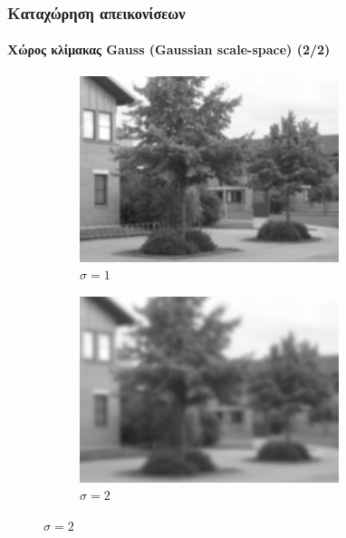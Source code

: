 \documentclass{beamer}
\begin{document}
\begin{frame}
\frametitle{Καταχώρηση απεικονίσεων}
\framesubtitle{Χώρος κλίμακας Gauss (Gaussian scale-space) (2/2)}

\begin{figure}[H]
    \centering

    \begin{subfigure}[b]{0.3\linewidth}
    \includegraphics[width=\linewidth]{Scalespace1.png}
    \caption{$\sigma=1$}
    \end{subfigure}
    \begin{subfigure}[b]{0.3\linewidth}
    \includegraphics[width=\linewidth]{Scalespace2.png}
    \caption{$\sigma=2$}
    \end{subfigure}


\end{figure}
\end{frame}
\end{document}
